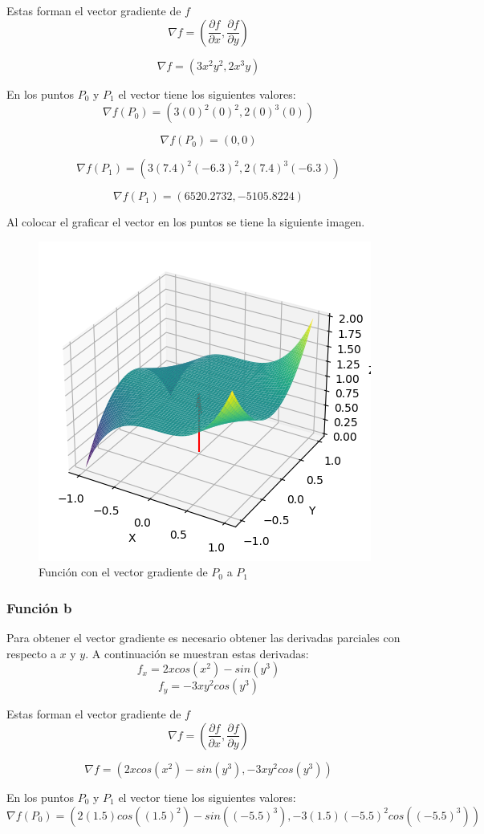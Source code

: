 \documentclass[12 pt]{article}
\begin{document}
Estas forman el vector gradiente de $f$
\[
    \nabla f = ( \frac{\partial f}{\partial x},  \frac{\partial f}{\partial y})
\]

\[
    \nabla f = ( 3x^2y^2,  2x^3y)
\]

En los puntos $P_0$ y $P_1$ el vector tiene los siguientes valores:
\[
    \nabla f(P_0) = ( 3(0)^2(0)^2,  2(0)^3(0))
\]

\[
    \nabla f(P_0) = ( 0,  0)
\]

\[
    \nabla f(P_1) = ( 3(7.4)^2(-6.3)^2,  2(7.4)^3(-6.3))
\]

\[
    \nabla f(P_1) = ( 6520.2732,  -5105.8224)
\]

Al colocar el graficar el vector en los puntos se tiene la siguiente imagen.
\begin{figure}[H]
    \centering
    \includegraphics[width=0.5\linewidth]{img/a_v.png}
    \caption{Función con el vector gradiente de $P_0$ a $P_1$}
    \label{fig:enter-label}
\end{figure}

\subsubsection{Función b}
Para obtener el vector gradiente es necesario obtener las derivadas parciales con respecto a $x$ y $y$. A continuación se muestran estas derivadas:
\[
    f_x = 2xcos(x^2) - sin(y^3)
\]
\[
    f_y = -3xy^2cos(y^3)
\]

Estas forman el vector gradiente de $f$
\[
    \nabla f = ( \frac{\partial f}{\partial x},  \frac{\partial f}{\partial y})
\]

\[
    \nabla f = ( 2xcos(x^2) - sin(y^3),  -3xy^2cos(y^3))
\]

En los puntos $P_0$ y $P_1$ el vector tiene los siguientes valores:
\[
    \nabla f(P_0) = (  2(1.5)cos((1.5)^2) - sin((-5.5)^3),  -3(1.5)(-5.5)^2cos((-5.5)^3))
\]
\end{document}

